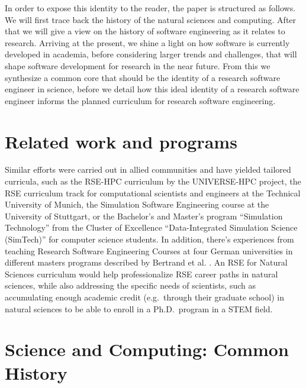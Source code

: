 \documentclass[
        twocolumn,german,biblatex
    ]{article}
\begin{document}
    In order to expose this identity to the reader, the paper is
    structured as follows. We will first trace back the history of the
    natural sciences and computing. After that we will give a view on
    the history of software engineering as it relates to research.
    Arriving at the present, we shine a light on how software is
    currently developed in academia, before considering larger trends
    and challenges, that will shape software development for research in
    the near future. From this we synthesize a common core that should
    be the identity of a research software engineer in science, before
    we detail how this ideal identity of a research software engineer
    informs the planned curriculum for research software engineering.

    \section{Related work and programs}\label{related-work-and-programs}

    Similar efforts were carried out in allied communities and have
    yielded tailored curricula, such as the RSE-HPC curriculum
    \autocite{Filinger2025} by the UNIVERSE-HPC project, the RSE
    curriculum track for computational scientists and engineers
    \autocite{Chourdakis2025} at the Technical University of Munich, the
    Simulation Software Engineering course \autocite{Uekermann2021} at
    the University of Stuttgart, or the Bachelor's and Master's program
    ``Simulation Technology'' from the Cluster of Excellence
    ``Data-Integrated Simulation Science (SimTech)''
    \autocite{SimTech2019} for computer science students. In addition,
    there's experiences from teaching Research Software Engineering
    Courses at four German universities in different masters programs
    described by Bertrand et al. \autocite{Bertrand2025}. An RSE for
    Natural Sciences curriculum would help professionalize RSE career
    paths in natural sciences, while also addressing the specific needs
    of scientists, such as accumulating enough academic credit
    (e.g.~through their graduate school) in natural sciences to be able
    to enroll in a Ph.D.~program in a STEM field.

    \section{Science and Computing: Common
    History}\label{science-and-computing-common-history}
\end{document}
